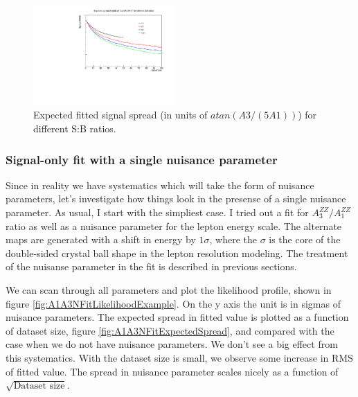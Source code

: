 \documentclass{cmspaper}
\begin{document}
\begin{figure}[htb!]
  \begin{center}
    \includegraphics[width=0.48\textwidth]{figures/A1A3BFit_SignalSpread.pdf}
    \caption{Expected fitted signal spread (in units of $atan(A3/(5 A1))$) for different S:B ratios.}
    \label{fig:A1A3BFitSignalSpread}
  \end{center}
\end{figure}


\subsubsection{Signal-only fit with a single nuisance parameter}

Since in reality we have systematics which will take the form of nuisance parameters, let's investigate
how things look in the presense of a single nuisance parameter.  As usual, I start with the simpliest
case.  I tried out a fit for $A_3^{ZZ}/A_1^{ZZ}$ ratio as well as a nuisance parameter for the lepton
energy scale.  The alternate maps are generated with a shift in energy by $1 \sigma$, where the $\sigma$
is the core of the double-sided crystal ball shape in the lepton resolution modeling.
The treatment of the nuisanse parameter in the fit is described in previous sections.

We can scan through all parameters and plot the likelihood profile, shown in figure
\ref{fig:A1A3NFitLikelihoodExample}.  On the y axis the unit is in sigmas of nuisance parameters.
The expected spread in fitted value is plotted as a function of dataset size, figure
\ref{fig:A1A3NFitExpectedSpread}, and compared
with the case when we do not have nuisance parameters.  We don't see a big
effect from this systematics.  With the dataset size is small, we observe some increase
in RMS of fitted value.  The spread in nuisance parameter scales nicely
as a function of $\sqrt{\text{Dataset size}}$.
\end{document}
